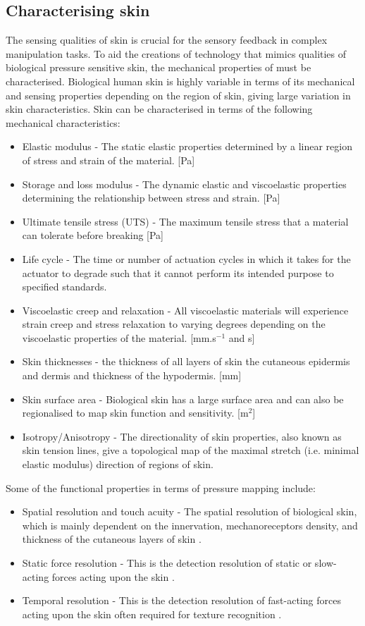 \subsection{Characterising skin}
\label{subsec:Characterising skin}
The sensing qualities of skin is crucial for the sensory feedback in complex manipulation tasks. To aid the creations of technology that mimics qualities of biological pressure sensitive skin, the mechanical properties of must be characterised. Biological human skin is highly variable in terms of its mechanical and sensing properties depending on the region of skin, giving large variation in skin characteristics. Skin can be characterised in terms of the following mechanical characteristics:
\begin{itemize}
    \item Elastic modulus -  The static elastic properties determined by a linear region of stress and strain of the material. [Pa]
    \item Storage and loss modulus - The dynamic elastic and viscoelastic properties determining the relationship between stress and strain. [Pa]
    \item Ultimate tensile stress (UTS) - The maximum tensile stress that a material can tolerate before breaking [Pa]
    \item Life cycle - The time or number of actuation cycles in which it takes for the actuator to degrade such that it cannot perform its intended purpose to specified standards.
    \item Viscoelastic creep and relaxation - All viscoelastic materials will experience strain creep and stress relaxation to varying degrees depending on the viscoelastic properties of the material. [mm.s$^{-1}$ and s]
    \item Skin thicknesses - the thickness of all layers of skin the cutaneous epidermis and dermis and thickness of the hypodermis. [mm]
    \item Skin surface area - Biological skin has a large surface area and can also be regionalised to map skin function and sensitivity. [m$^2$]
    \item Isotropy/Anisotropy - The directionality of skin properties, also known as skin tension lines, give a topological map of the maximal stretch (i.e. minimal elastic modulus) direction of regions of skin.
\end{itemize}
Some of the functional properties in terms of pressure mapping include:
\begin{itemize}
    \item Spatial resolution and touch acuity - The spatial resolution of biological skin, which is mainly dependent on the innervation, mechanoreceptors density, and thickness of the cutaneous layers of skin \cite{Landry2021,Klein2016,Krotoski1993}.
    \item Static force resolution - This is the detection resolution of static or slow-acting forces acting upon the skin \cite{Krotoski1993}.
    \item Temporal resolution - This is the detection resolution of fast-acting forces acting upon the skin often required for texture recognition \cite{Landry2021,Krotoski1993}.
\end{itemize}

